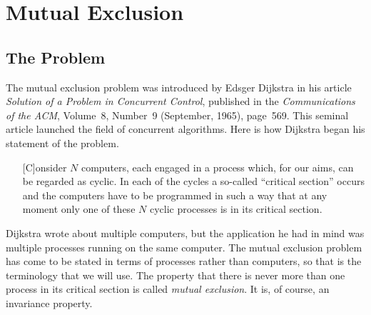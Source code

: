 \documentclass[fleqn,leqno]{article}
\begin{document}
\renewcommand{\contentsname}{The \emph{Principles} Track\protect\target{top}}
\addtocounter{section}{-1}

\showversions
\tableofcontents
\hideversions
\vfill 
\newpage
\vspace*{-\baselineskip}

\section{Mutual Exclusion}


\subsection{The Problem}

The mutual 
exclusion problem was introduced by Edsger
 Dijkstra in his
article \emph{Solution of a Problem in Concurrent Control}, published
in the \emph{Communications of the ACM}, Volume~8, Number~9
(September, 1965), page~569.  This seminal article launched the field
of concurrent algorithms.  Here is how Dijkstra began his statement of
the problem.
\begin{itemize}
\item[]
[C]onsider $N$ computers, each engaged in a
process which, for our aims, can be regarded as cyclic. In
each of the cycles a so-called ``critical 
section'' occurs and
the computers have to be programmed in such a way that
at any moment only one of these $N$ cyclic processes is in
its critical section. 
\end{itemize}
Dijkstra wrote about multiple computers, but the application he had in
mind was multiple processes running on the same computer.  The mutual
exclusion problem has come to be stated in terms of processes 
rather than computers, so that is the terminology that we will use.
%
The property that there is never more than one process in its
critical section is called \emph{mutual exclusion}. It is, of course,
an invariance property.
\end{document}
